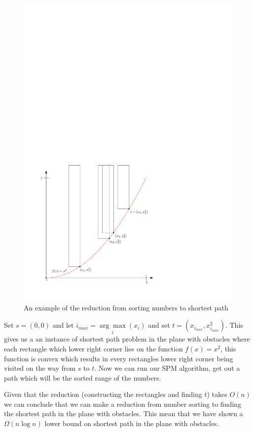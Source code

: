 \begin{figure}[H]
	\includegraphics{figures/reduction.pdf}
	\caption{An example of the reduction from sorting numbers to shortest path}
	\label{fig:reduction}
\end{figure}

Set $s=(0,0)$ and let
$i_{max}=\underset{i}{\arg\max}(x_i)$ and set $t=(x_{i_{max}},x_{i_{max}}^2)$.
This gives us a an instance of shortest path problem in the plane with obstacles where
each rectangle which lower right corner lies on the
function $f(x)=x^2$, this function is convex which results in every rectangles
lower right corner being visited on the way from $s$ to $t$. Now we can run our
SPM algorithm, get out a path which will be the sorted range of the numbers.

Given that the reduction (constructing the rectangles and finding $t$) takes
$O(n)$ we can conclude that we can make a reduction from number sorting to
finding the shortest path in the plane with obstacles. This mean that we have
shown a $\Omega{(n\log n)}$ lower bound on shortest path in the plane with obstacles.
